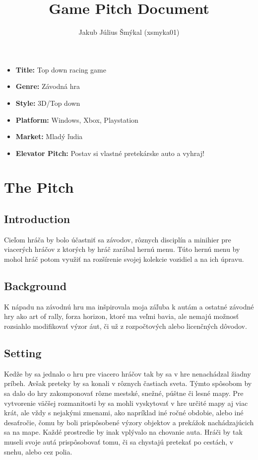 \documentclass[a4paper,10pt,slovak]{article}
\title{%
Game Pitch Document%
}
\author{%
Jakub Július Šmýkal (xsmyka01)%
}
\date{}
\begin{document}
\maketitle
\thispagestyle{empty}

{%
\large

\begin{itemize}

\item[] \textbf{Title:} Top down racing game

\item[] \textbf{Genre:} Závodná hra

\item[] \textbf{Style:} 3D/Top down

\item[] \textbf{Platform:} Windows, Xbox, Playstation

\item[] \textbf{Market:} Mladý ľudia

\item[] \textbf{Elevator Pitch:} Postav si vlastné pretekárske auto a vyhraj!

\end{itemize}

}

\section*{\centering The Pitch}

\subsection*{Introduction}
Cieľom hráča by bolo účastniť sa závodov, rôznych disciplín a minihier pre viacerých hráčov z ktorých by hráč zarábal hernú menu. Túto hernú menu by mohol hráč potom využiť na rozšírenie svojej kolekcie vozidiel a na ich úpravu.

\subsection*{Background}
K nápadu na závodnú hru ma inšpirovala moja záľuba k autám a ostatné závodné hry ako art of rally, forza horizon, ktoré ma veľmi bavia, ale nemajú možnosť rozsiahlo modifikovať výzor áut, či už z rozpočtových alebo licenčných dôvodov.

\subsection*{Setting}
Kedže by sa jednalo o hru pre viacero hráčov tak by sa v hre nenachádzal žiadny príbeh. Avšak preteky by sa konali v rôznych častiach sveta. Týmto spôsobom by sa dalo do hry zakomponovať rôzne mestské, snežné, púštne či lesné mapy. Pre vytvorenie väčšej rozmanitosti by sa mohli vyskytovať v hre určité mapy aj viac krát, ale vždy s nejakými zmenami, ako napríklad iné ročné obdobie, alebo iné desaťročie, čomu by boli prispôsobené výzory objektov a prekážok nachádzajúcich sa na mape. Každé prostredie by inak vplývalo na chovanie auta. Hráči by tak museli svoje autá prispôsobovať tomu, či sa chystajú pretekať po cestách, v snehu, alebo cez polia.
\end{document}
